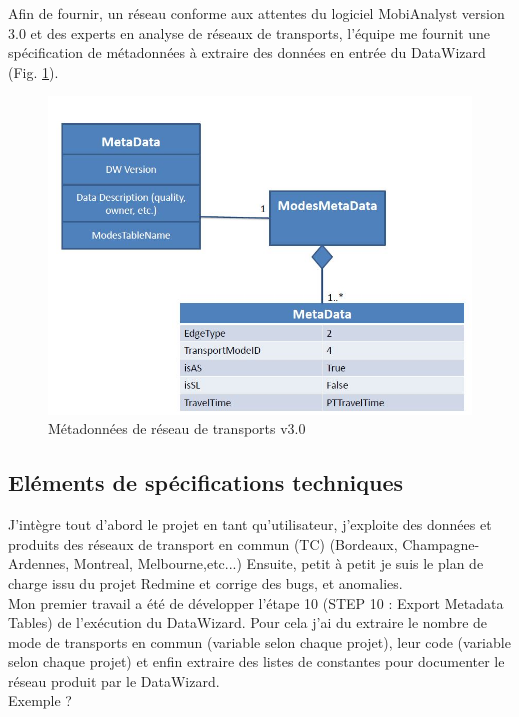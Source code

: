 \begin{itemize}
Afin de fournir, un réseau conforme aux attentes du logiciel MobiAnalyst \og version 3.0 \fg et des experts en analyse de réseaux de transports, l'équipe me fournit une spécification de métadonnées à extraire des données en entrée du DataWizard (Fig. \ref{DW_Metadata}).\\

\begin{figure}[!h]
\centering
\includegraphics[width=12cm]{images/DW_specMetadata.JPG}
\caption{\label{DW_Metadata}Métadonnées de réseau de transports v3.0}
\end{figure} 

\subsection{Eléments de spécifications techniques}

J'intègre tout d'abord le projet en tant qu'utilisateur, j'exploite des données et produits des réseaux de transport en commun (TC) (Bordeaux, Champagne-Ardennes, Montreal, Melbourne,etc...) Ensuite, petit à petit je suis le plan de charge issu du projet Redmine et corrige des bugs, et anomalies.\\

Mon premier travail a été de développer l'étape 10 (STEP 10 : Export Metadata Tables) de l'exécution du DataWizard. Pour cela j'ai du extraire le nombre de mode de transports en commun (variable selon chaque projet), leur code (variable selon chaque projet) et enfin extraire des listes de constantes pour documenter le réseau produit par le DataWizard.\\

Exemple ?\\


\end{itemize}
